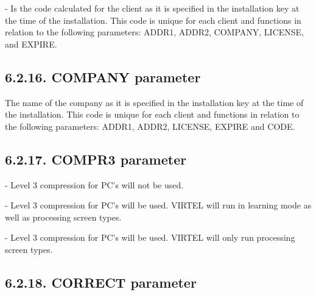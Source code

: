 \documentclass[letterpaper,10pt,english]{sphinxmanual}
\begin{document}
 - Is the code calculated for the client as it is specified in the installation key at the time of the installation. This code
is unique for each client and functions in relation to the following parameters: ADDR1, ADDR2, COMPANY, LICENSE, and EXPIRE.


\subsection{6.2.16. COMPANY parameter}
\label{\detokenize{Installation_Guide:company-parameter}}
\begin{sphinxVerbatim}[commandchars=\\\{\}]
 
\end{sphinxVerbatim}

The name of the company as it is specified in the installation key at the time of the installation. This code is unique for
each client and functions in relation to the following parameters: ADDR1, ADDR2, LICENSE, EXPIRE and CODE.


\subsection{6.2.17. COMPR3 parameter}
\label{\detokenize{Installation_Guide:compr3-parameter}}
\begin{sphinxVerbatim}[commandchars=\\\{\}]
 
\end{sphinxVerbatim}

 - Level 3 compression for PC’s will not be used.

 - Level 3 compression for PC’s will be used. VIRTEL will run in learning mode as well as processing screen types.

 - Level 3 compression for PC’s will be used. VIRTEL will only run processing screen types.


\subsection{6.2.18. CORRECT parameter}
\label{\detokenize{Installation_Guide:correct-parameter}}
\begin{sphinxVerbatim}[commandchars=\\\{\}]
  
\end{sphinxVerbatim}
\end{document}
